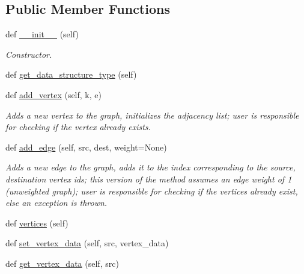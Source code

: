 \subsection*{Public Member Functions}
\begin{DoxyCompactItemize}
\item 
def \mbox{\hyperlink{classbridges_1_1graph__adj__matrix_1_1_graph_adj_matrix_a77b2efa6f296054ada425ee61e0d22a8}{\+\_\+\+\_\+init\+\_\+\+\_\+}} (self)
\begin{DoxyCompactList}\small\item\em Constructor. \end{DoxyCompactList}\item 
def \mbox{\hyperlink{classbridges_1_1graph__adj__matrix_1_1_graph_adj_matrix_a54eb655222dcff0a569728b150e493b7}{get\+\_\+data\+\_\+structure\+\_\+type}} (self)
\item 
def \mbox{\hyperlink{classbridges_1_1graph__adj__matrix_1_1_graph_adj_matrix_aa6fa31ebae643950dd33628269136d00}{add\+\_\+vertex}} (self, k, e)
\begin{DoxyCompactList}\small\item\em Adds a new vertex to the graph, initializes the adjacency list; user is responsible for checking if the vertex already exists. \end{DoxyCompactList}\item 
def \mbox{\hyperlink{classbridges_1_1graph__adj__matrix_1_1_graph_adj_matrix_aad67dc7b3da58ff67fd807a3455765c1}{add\+\_\+edge}} (self, src, dest, weight=None)
\begin{DoxyCompactList}\small\item\em Adds a new edge to the graph, adds it to the index corresponding to the source, destination vertex ids; this version of the method assumes an edge weight of 1 (unweighted graph); user is responsible for checking if the vertices already exist, else an exception is thrown. \end{DoxyCompactList}\item 
def \mbox{\hyperlink{classbridges_1_1graph__adj__matrix_1_1_graph_adj_matrix_a2f7f0fe4ba172afeb1dcb1afc1f6bf31}{vertices}} (self)
\item 
def \mbox{\hyperlink{classbridges_1_1graph__adj__matrix_1_1_graph_adj_matrix_a96d735f98243acee1a604ed9dc990356}{set\+\_\+vertex\+\_\+data}} (self, src, vertex\+\_\+data)
\item 
def \mbox{\hyperlink{classbridges_1_1graph__adj__matrix_1_1_graph_adj_matrix_a6ae3c6fbe98c554ba976ef095a77871b}{get\+\_\+vertex\+\_\+data}} (self, src)

\end{DoxyCompactItemize}
